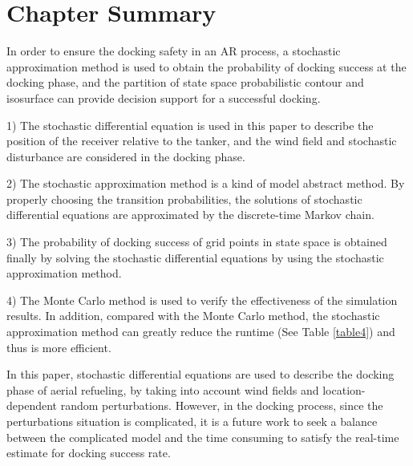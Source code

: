 \section{Chapter Summary}
In order to ensure the docking safety in an AR process, a stochastic approximation method is used to obtain the probability of docking success at the docking phase, and the partition of state space probabilistic contour and isosurface can provide decision support for a successful docking.

1) The stochastic differential equation is used in this paper to describe the position of the receiver relative to the tanker, and the wind field and stochastic disturbance are considered in the docking phase.

2) The stochastic approximation method is a kind of model abstract method. By properly choosing the transition probabilities, the solutions of stochastic differential equations are approximated by the discrete-time Markov chain.

3) The probability of docking success of grid points in state space is obtained finally by solving the stochastic differential equations by using the stochastic approximation method.

4) The Monte Carlo method is used to verify the effectiveness of the simulation results. In addition, compared with the Monte Carlo method, the stochastic approximation method can greatly reduce the runtime (See Table \ref{table4}) and thus is more efficient.

In this paper, stochastic differential equations are used to describe the docking phase of aerial refueling, by taking into account wind fields and location-dependent random perturbations. However, in the docking process, since the perturbations situation is complicated, it is a future work to seek a balance between the complicated model and the time consuming to satisfy the real-time estimate for docking success rate.



